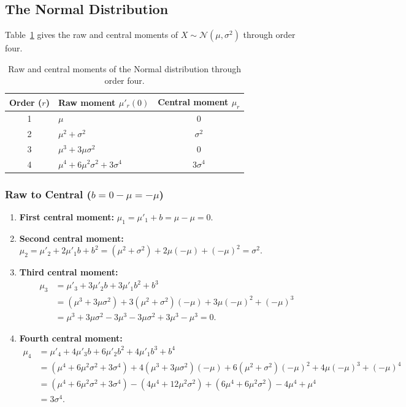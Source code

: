 \documentclass[
  12pt]{article}
\begin{document}
\subsection{The Normal Distribution}

Table~\ref{tab:normal} gives the raw and central moments of $X \sim \mathcal{N}(\mu, \sigma^2)$ through order four.

\begin{table}[htbp]
\centering
\small
\begin{tabular}{@{}clc@{}}
\toprule
Order ($r$) & Raw moment $\mu'_r(0)$ & Central moment $\mu_r$ \\
\midrule
1 & $\mu$ & $0$ \\
2 & $\mu^2 + \sigma^2$ & $\sigma^2$ \\
3 & $\mu^3 + 3\mu\sigma^2$ & $0$ \\
4 & $\mu^4 + 6\mu^2\sigma^2 + 3\sigma^4$ & $3\sigma^4$ \\
\bottomrule
\end{tabular}
\caption{Raw and central moments of the Normal distribution through order four.}
\label{tab:normal}
\end{table}

\subsubsection{Raw to Central ($b = 0 - \mu = -\mu$)}

\begin{enumerate}
\item \textbf{First central moment:} $\mu_1 = \mu'_1 + b = \mu - \mu = 0$.
\item \textbf{Second central moment:} $\mu_2 = \mu'_2 + 2\mu'_1 b + b^2 = (\mu^2 + \sigma^2) + 2\mu(-\mu) + (-\mu)^2 = \sigma^2$.
\item \textbf{Third central moment:}
\begin{align*}
\mu_3 &= \mu'_3 + 3\mu'_2 b + 3\mu'_1 b^2 + b^3 \\
      &= (\mu^3 + 3\mu\sigma^2) + 3(\mu^2 + \sigma^2)(-\mu) + 3\mu(-\mu)^2 + (-\mu)^3 \\
      &= \mu^3 + 3\mu\sigma^2 - 3\mu^3 - 3\mu\sigma^2 + 3\mu^3 - \mu^3 = 0.
\end{align*}
\item \textbf{Fourth central moment:}
\begin{align*}
\mu_4 &= \mu'_4 + 4\mu'_3 b + 6\mu'_2 b^2 + 4\mu'_1 b^3 + b^4 \\
      &= (\mu^4 + 6\mu^2\sigma^2 + 3\sigma^4) + 4(\mu^3 + 3\mu\sigma^2)(-\mu) + 6(\mu^2 + \sigma^2)(-\mu)^2 + 4\mu(-\mu)^3 + (-\mu)^4 \\
      &= (\mu^4 + 6\mu^2\sigma^2 + 3\sigma^4) - (4\mu^4 + 12\mu^2\sigma^2) + (6\mu^4 + 6\mu^2\sigma^2) - 4\mu^4 + \mu^4 \\
      &= 3\sigma^4.
\end{align*}
\end{enumerate}
\end{document}
